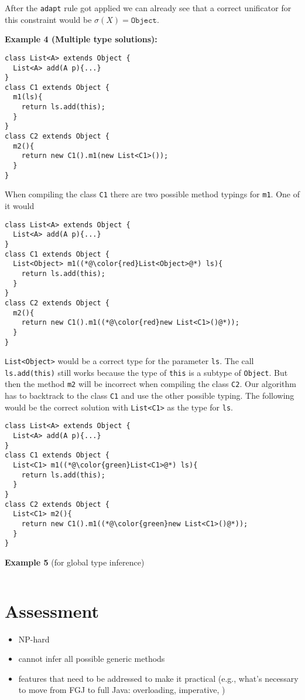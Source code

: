 \documentclass[a4paper,USenglish,cleveref, autoref, thm-restate]{lipics-v2021}
\begin{document}
After the \texttt{adapt} rule got applied we can already see that a correct unificator for this constraint would be
$\sigma(X) = \texttt{Object}$.

\textbf{Example 4 (Multiple type solutions):}
\begin{lstlisting}
class List<A> extends Object {
  List<A> add(A p){...}
}
class C1 extends Object {
  m1(ls){
    return ls.add(this);
  }
}
class C2 extends Object {
  m2(){
    return new C1().m1(new List<C1>());
  }
}
\end{lstlisting}
When compiling the class \texttt{C1} there are two possible method typings for \texttt{m1}.
One of it would 
\begin{lstlisting}
class List<A> extends Object {
  List<A> add(A p){...}
}
class C1 extends Object {
  List<Object> m1((*@\color{red}List<Object>@*) ls){
    return ls.add(this);
  }
}
class C2 extends Object {
  m2(){
    return new C1().m1((*@\color{red}new List<C1>()@*));
  }
}
\end{lstlisting}
\texttt{List<Object>} would be a correct type for the parameter \texttt{ls}.
The call \texttt{ls.add(this)} still works because the type of \texttt{this} is a subtype of \texttt{Object}.
But then the method \texttt{m2} will be incorrect when compiling the class \texttt{C2}.
Our algorithm has to backtrack to the class \texttt{C1} and use the other possible typing.
The following would be the correct solution with \texttt{List<C1>} as the type for \texttt{ls}.
\begin{lstlisting}
class List<A> extends Object {
  List<A> add(A p){...}
}
class C1 extends Object {
  List<C1> m1((*@\color{green}List<C1>@*) ls){
    return ls.add(this);
  }
}
class C2 extends Object {
  List<C1> m2(){
    return new C1().m1((*@\color{green}new List<C1>()@*));
  }
}
\end{lstlisting}

\textbf{Example 5} (for global type inference)
\begin{lstlisting}

\end{lstlisting}

\section{Assessment}
\label{sec:assessment}

\begin{itemize}
\item NP-hard 
\item cannot infer all possible generic methods
\item features that need to be addressed to make it practical (e.g.,
  what's necessary to move from FGJ to full Java: overloading,
  imperative, )
\end{itemize}
\end{document}
